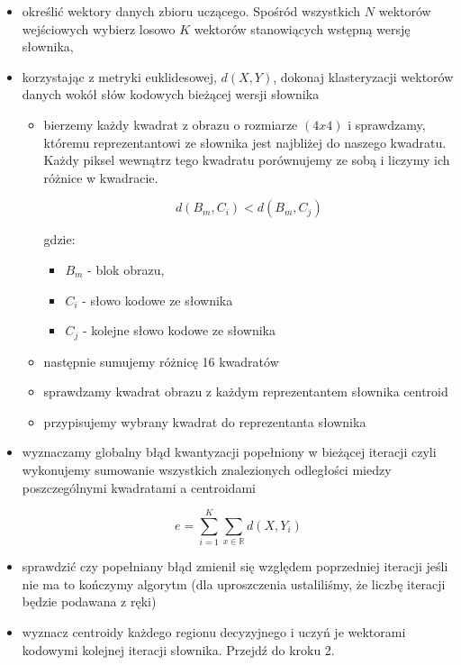 \documentclass{article}
\begin{document}
\begin{itemize} 
\item określić wektory danych zbioru uczącego. Spośród wszystkich $N$ wektorów wejściowych 
  wybierz losowo $K$ wektorów stanowiących wstępną wersję słownika,
\item korzystając z metryki euklidesowej, $d(X,Y)$, dokonaj klasteryzacji wektorów danych wokół słów kodowych bieżącej wersji słownika
     \begin{itemize}
        \item bierzemy każdy kwadrat z obrazu o rozmiarze $(4x4)$ i sprawdzamy, któremu reprezentantowi ze słownika jest najbliżej do 
        naszego kwadratu. Każdy piksel wewnątrz tego kwadratu porównujemy ze sobą i liczymy ich różnice w kwadracie.
        
		\begin{equation}
		d(B_{m}, C_{i}) < d(B_{m}, C_{j})
		\end{equation}
		
		gdzie:
		\begin{itemize}[label=]
    		\item $B_{m}$ - blok obrazu,
    		\item $C_{i}$ - słowo kodowe ze słownika
    		\item $C_{j}$ - kolejne słowo kodowe ze słownika
		\end{itemize}	        
        
        \item następnie sumujemy różnicę 16 kwadratów
        \item sprawdzamy kwadrat obrazu z każdym reprezentantem słownika centroid
        \item przypisujemy wybrany kwadrat do reprezentanta słownika
     \end{itemize}
\item wyznaczamy globalny błąd kwantyzacji popełniony w bieżącej iteracji czyli wykonujemy sumowanie wszystkich 
  znalezionych odległości miedzy poszczególnymi kwadratami a centroidami 
 
\begin{equation}
\label{eq:lbg_error}
e = \sum_{i=1}^K \sum_{x\in\mathbb{R}} d(X, Y_{i}) 
\end{equation}

\item sprawdzić czy popełniany błąd zmienił się względem poprzedniej iteracji jeśli nie ma to kończymy algorytm 
  (dla uproszczenia ustaliliśmy, że liczbę iteracji będzie podawana z ręki)
\item wyznacz centroidy każdego regionu decyzyjnego i uczyń je wektorami kodowymi kolejnej iteracji słownika. Przejdź do kroku 2. 
\end{itemize}
 
\end{document}

